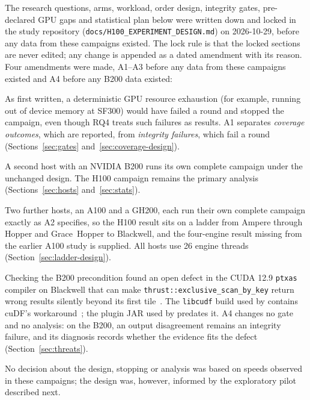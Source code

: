 \documentclass[11pt]{article}
\begin{document}
The research questions, arms, workload, order design, integrity gates,
pre-declared GPU gaps and statistical plan below were written down and locked
in the study repository (\texttt{docs/H100\_EXPERIMENT\_DESIGN.md}) on
2026-10-29, before any data from these campaigns existed. The lock rule is that
the locked sections are never edited; any change is appended as a dated
amendment with its reason. Four amendments were made, A1--A3 before any
data from these campaigns existed and A4 before any B200 data existed:
\begin{description}[leftmargin=*,itemsep=2pt]
  \item[A1 (failure classification, 2026-10-29).] As first written, a
    deterministic GPU resource exhaustion (for example, running out of device
    memory at SF300) would have failed a round and stopped the campaign, even
    though RQ4 treats such failures as results. A1 separates \emph{coverage
    outcomes}, which are reported, from \emph{integrity failures}, which fail
    a round (Sections~\ref{sec:gates} and~\ref{sec:coverage-design}).
  \item[A2 (B200 host, 2026-10-29).] A second host with an NVIDIA B200 runs
    its own complete campaign under the unchanged design. The H100 campaign
    remains the primary analysis (Sections~\ref{sec:hosts}
    and~\ref{sec:stats}).
  \item[A3 (GPU-generation ladder, 2026-10-30).] Two further hosts, an A100
    and a GH200, each run their own complete campaign exactly as A2 specifies,
    so the H100 result sits on a ladder from Ampere through Hopper and
    Grace~Hopper to Blackwell, and the four-engine result missing from the
    earlier A100 study is supplied. All hosts use 26 engine threads
    (Section~\ref{sec:ladder-design}).
  \item[A4 (known Blackwell compiler defect, 2026-10-30).] Checking the B200
    precondition found an open defect in the CUDA 12.9 \texttt{ptxas}
    compiler on Blackwell that can make
    \texttt{thrust::exclusive\_scan\_by\_key} return wrong results silently
    beyond its first tile~\citep{cccl11167}. The \texttt{libcudf} build used by
    \polarsgpu{} contains cuDF's workaround~\citep{cudf23973}; the plugin JAR
    used by \sparkgpu{} predates it. A4 changes no gate and no analysis: on the
    B200, an output disagreement remains an integrity failure, and its diagnosis
    records whether the evidence fits the defect (Section~\ref{sec:threats}).
\end{description}
No decision about the design, stopping or analysis was based on speeds
observed in these campaigns; the design was, however, informed by the
exploratory pilot described next.
\end{document}
